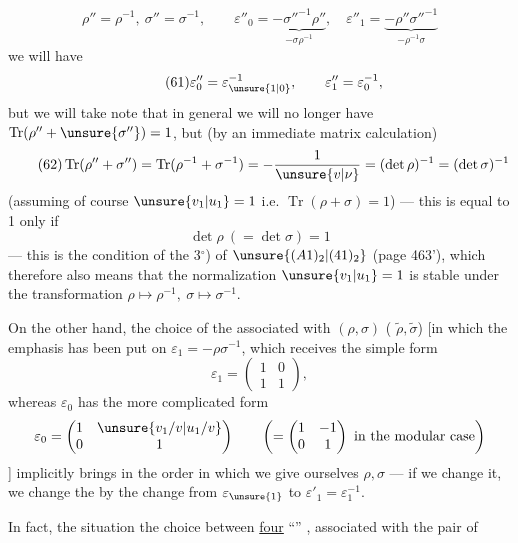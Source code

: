 \[
\tag{60}
\rho''=\rho^{-1},\ \sigma''=\sigma^{-1},\qquad
\varepsilon''_0=\underbrace{-\sigma''^{-1}\rho''}_{-\sigma\rho^{-1}},\quad
\varepsilon''_1=\underbrace{-\rho''\sigma''^{-1}}_{-\rho^{-1}\sigma}
\]
we will have
\[
\tag{61}
\varepsilon''_0=\varepsilon_{\unsure{1|0}}^{-1},\qquad
\varepsilon''_1=\varepsilon_0^{-1},
\]
but we will take note that in general we will no longer have $\operatorname{Tr}(\rho''+\unsure{\sigma''})=1$, but (by an immediate matrix calculation)
\[
\tag{62}
\operatorname{Tr}(\rho''+\sigma'')
=\operatorname{Tr}(\rho^{-1}+\sigma^{-1})
=-\frac{1}{\unsure{v|\nu}}
=(\det\rho)^{-1}=(\det\sigma)^{-1}
\]
(assuming of course  $\unsure{v_1|u_1}=1$ i.e. $\operatorname{Tr}(\rho+\sigma)=1$)
--- this is equal to 1 only if
\[
\tag{63}
\det\rho\ (=\det\sigma)=1
\]
--- this is the condition of the  3$^\circ$) of $\unsure{(A1)_2|(41)_2}$ (page 463'), which therefore also means that the normalization $\unsure{v_1|u_1}=1$ is stable under the transformation $\rho\mapsto\rho^{-1},\ \sigma\mapsto\sigma^{-1}$.

On the other hand, the choice of the \uline{} associated with $(\rho,\sigma)$ ( $\widetilde\rho,\widetilde\sigma$) [in which the emphasis has been put on $\varepsilon_1=-\rho\sigma^{-1}$, which receives the simple form
\[
\varepsilon_1=\begin{pmatrix}1&0\\1&1\end{pmatrix},
\]
whereas $\varepsilon_0$  has the more complicated form
\[
\varepsilon_0=\begin{pmatrix}1&\unsure{v_1/v|u_1/v}\\0&1\end{pmatrix}
\qquad\left(=\begin{pmatrix}1&-1\\0&1\end{pmatrix}\text{ in the modular case}\right)
\]
] implicitly brings in the order in which we give ourselves $\rho,\sigma$ --- if we change it, we change the  by the change from $\varepsilon_{\unsure{1}}$ to $\varepsilon'_1=\varepsilon_1^{-1}$.

In fact, the situation  the choice between \uline{four} ``'' , associated with the pair of



